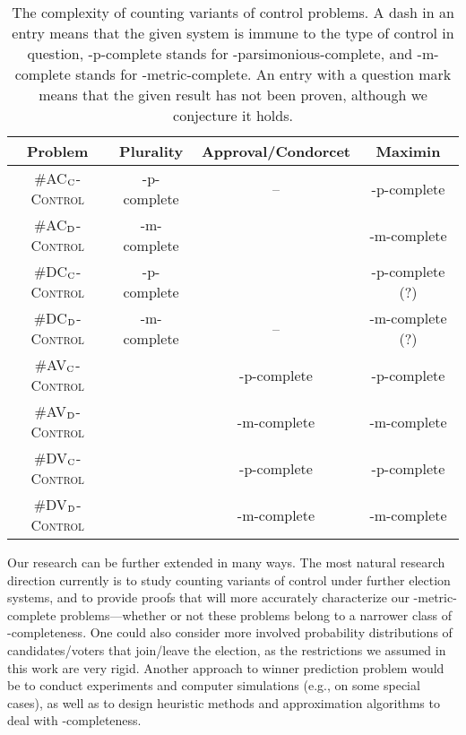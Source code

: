 \begin{table}[ht!]
	\begin{center}
		\begin{tabular}{|c|c|c|c|}
			\hline
			Problem & Plurality & Approval/Condorcet & Maximin \\
			\hline \hline
			\textnormal{\#AC${}_\textnormal{C}$}-\textsc{Control} & \sharpPclass-p-complete & -- & \sharpPclass-p-complete \\
			\hline
			\textnormal{\#AC${}_\textnormal{D}$}-\textsc{Control} & \sharpPclass-m-complete & \FPclass & \sharpPclass-m-complete \\
			\hline
			\textnormal{\#DC${}_\textnormal{C}$}-\textsc{Control} & \sharpPclass-p-complete & \FPclass & \sharpPclass-p-complete (?) \\
			\hline
			\textnormal{\#DC${}_\textnormal{D}$}-\textsc{Control} & \sharpPclass-m-complete & -- & \sharpPclass-m-complete (?) \\
			\hline
			\textnormal{\#AV${}_\textnormal{C}$}-\textsc{Control} & \FPclass & \sharpPclass-p-complete & \sharpPclass-p-complete \\
			\hline
			\textnormal{\#AV${}_\textnormal{D}$}-\textsc{Control} & \FPclass & \sharpPclass-m-complete & \sharpPclass-m-complete \\
			\hline
			\textnormal{\#DV${}_\textnormal{C}$}-\textsc{Control} & \FPclass & \sharpPclass-p-complete & \sharpPclass-p-complete \\
			\hline
			\textnormal{\#DV${}_\textnormal{D}$}-\textsc{Control} & \FPclass & \sharpPclass-m-complete & \sharpPclass-m-complete \\
			\hline
		\end{tabular}
		\caption{The complexity of counting variants of control problems. A dash in an entry means that the given system is immune to the type of control in question, \sharpPclass-p-complete stands for \sharpPclass-parsimonious-complete, and \sharpPclass-m-complete stands for \sharpPclass-metric-complete. An entry with a question mark means that the given result has not been proven, although we conjecture it holds.} \label{tab:results}
	\end{center}
\end{table}

Our research can be further extended in many ways.
The most natural research direction currently is to study counting variants of control under further election systems, and to provide proofs that will more accurately characterize our \sharpPclass-metric-complete problems---whether or not these problems belong to a narrower class of \sharpPclass-completeness.
One could also consider more involved probability distributions of candidates/voters that join/leave the election, as the restrictions we assumed in this work are very rigid.
Another approach to winner prediction problem would be to conduct experiments and computer simulations (e.g., on some special cases), as well as to design heuristic methods and approximation algorithms to deal with \sharpPclass-completeness.
